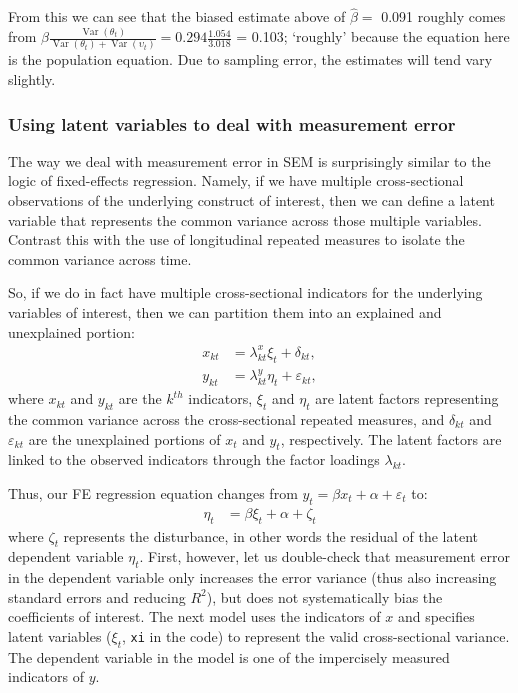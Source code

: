 \documentclass[]{interact}
\theoremstyle{plain}%
\theoremstyle{definition}
\theoremstyle{remark}
\begin{document}
\doublespacing

\singlespacing

\doublespacing

From this we can see that the biased estimate above of \(\hat{\beta} =\)
0.091 roughly comes from
\(\beta \frac{\mathop{\mathrm{\mathrm{Var}}}(\theta_{t})}{\mathop{\mathrm{\mathrm{Var}}}(\theta_{t}) + \mathop{\mathrm{\mathrm{Var}}}(\upsilon_{t})} = 0.294 \frac{1.054}{3.018}\)
= 0.103; `roughly' because the equation here is the population equation.
Due to sampling error, the estimates will tend vary slightly.

\hypertarget{using-latent-variables-to-deal-with-measurement-error}{%
\subsubsection{Using latent variables to deal with measurement
error}\label{using-latent-variables-to-deal-with-measurement-error}}

The way we deal with measurement error in SEM is surprisingly similar to
the logic of fixed-effects regression. Namely, if we have multiple
cross-sectional observations of the underlying construct of interest,
then we can define a latent variable that represents the common variance
across those multiple variables. Contrast this with the use of
longitudinal repeated measures to isolate the common variance across
time.

So, if we do in fact have multiple cross-sectional indicators for the
underlying variables of interest, then we can partition them into an
explained and unexplained portion:\\
\begin{align}
x_{kt} & = \lambda_{kt}^{x}\xi_{t} + \delta_{kt}, \\
y_{kt} & = \lambda_{kt}^{y}\eta_{t} + \varepsilon_{kt},
\end{align} where \(x_{kt}\) and \(y_{kt}\) are the \(k^{th}\)
indicators, \(\xi_{t}\) and \(\eta_{t}\) are latent factors representing
the common variance across the cross-sectional repeated measures, and
\(\delta_{kt}\) and \(\varepsilon_{kt}\) are the unexplained portions of
\(x_{t}\) and \(y_{t}\), respectively. The latent factors are linked to
the observed indicators through the factor loadings \(\lambda_{kt}\).

Thus, our FE regression equation changes from
\(y_{t} = \beta x_{t} + \alpha + \varepsilon_{t}\) to: \begin{align}
\eta_{t} & = \beta \xi_{t} + \alpha + \zeta_{t}
\end{align} where \(\zeta_{t}\) represents the disturbance, in other
words the residual of the latent dependent variable \(\eta_{t}\). First,
however, let us double-check that measurement error in the dependent
variable only increases the error variance (thus also increasing
standard errors and reducing \(R^{2}\)), but does not systematically
bias the coefficients of interest. The next model uses the indicators of
\(x\) and specifies latent variables (\(\xi_{t}\), \texttt{xi} in the
code) to represent the valid cross-sectional variance. The dependent
variable in the model is one of the impercisely measured indicators of
\(y\).
\end{document}
